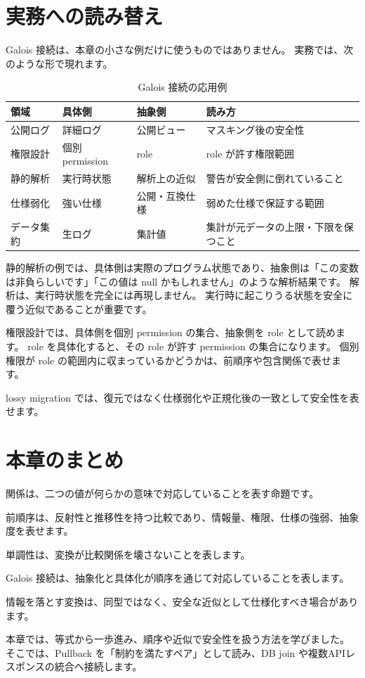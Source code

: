 \section{実務への読み替え}

Galois 接続は、本章の小さな例だけに使うものではありません。
実務では、次のような形で現れます。

\begin{table}[htbp]
\centering
\caption{Galois 接続の応用例}
\label{tab:ch22-galois-applications}
\begin{tabular}{llll}
\toprule
領域 & 具体側 & 抽象側 & 読み方 \\
\midrule
公開ログ & 詳細ログ & 公開ビュー & マスキング後の安全性 \\
権限設計 & 個別 permission & role & role が許す権限範囲 \\
静的解析 & 実行時状態 & 解析上の近似 & 警告が安全側に倒れていること \\
仕様弱化 & 強い仕様 & 公開・互換仕様 & 弱めた仕様で保証する範囲 \\
データ集約 & 生ログ & 集計値 & 集計が元データの上限・下限を保つこと \\
\bottomrule
\end{tabular}
\end{table}

静的解析の例では、具体側は実際のプログラム状態であり、抽象側は「この変数は非負らしいです」「この値は null かもしれません」のような解析結果です。
解析は、実行時状態を完全には再現しません。
実行時に起こりうる状態を安全に覆う近似であることが重要です。

権限設計では、具体側を個別 permission の集合、抽象側を role として読めます。
role を具体化すると、その role が許す permission の集合になります。
個別権限が role の範囲内に収まっているかどうかは、前順序や包含関係で表せます。

lossy migration では、復元ではなく仕様弱化や正規化後の一致として安全性を表せます。

\section{本章のまとめ}

関係は、二つの値が何らかの意味で対応していることを表す命題です。

前順序は、反射性と推移性を持つ比較であり、情報量、権限、仕様の強弱、抽象度を表せます。

単調性は、変換が比較関係を壊さないことを表します。

Galois 接続は、抽象化と具体化が順序を通じて対応していることを表します。

情報を落とす変換は、同型ではなく、安全な近似として仕様化すべき場合があります。

本章では、等式から一歩進み、順序や近似で安全性を扱う方法を学びました。
そこでは、Pullback を「制約を満たすペア」として読み、DB join や複数APIレスポンスの統合へ接続します。
